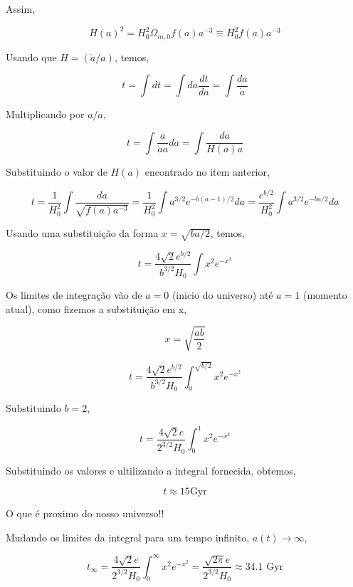 \documentclass[11pt]{article}
\begin{document}
\begin{pproblem}
\begin{pssolution*}{}{}
\begin{alternativas}
        Assim, 

        \[\boxed{H(a)^2 = H_0^2 \Omega_{m,0} f(a)a^{-3} \equiv H_0^2 f(a)a^{-3}}\]

        \item Usando que \(H = (\dot{a}/a)\), temos, 
        
        \[t = \int dt = \int da\frac{dt}{da} = \int \frac{da}{\dot{a}} \]

        Multiplicando por \(a/a\), 

        \[t = \int\frac{a}{\dot{a}a}da = \int \frac{da}{H(a)a}\]

        Substituindo o valor de \(H(a)\) encontrado no item anterior, 

        \[t = \frac{1}{H_0^2}\int\frac{da}{\sqrt{f(a)a^{-3}}} = \frac{1}{H_0^2}\int a^{3/2} e^{-b(a-1)/2}da = \frac{e^{b/2}}{H_0^2}\int a^{3/2}e^{-ba/2}da\]
        
        Usando uma substituição da forma \(x = \sqrt{ba/2}\), temos, 

        \[t = \frac{4\sqrt{2}e^{b/2}}{b^{3/2}H_0}\int x^2e^{-x^2}\]

        Os limites de integração vão de \(a=0\) (inicio do universo) até \(a=1\) (momento atual), como fizemos a substituição em x, 

        \[x = \sqrt{\frac{ab}{2}}\]

        \[t = \frac{4\sqrt{2}e^{b/2}}{b^{3/2}H_0}\int_0^{\sqrt{b/2}} x^2e^{-x^2}\]

        Substituindo \(b=2\), 

        \[t = \frac{4\sqrt{2}e}{2^{3/2}H_0}\int_0^{1} x^2e^{-x^2}\]

        Substituindo os valores e ultilizando a integral fornecida, obtemos, 

        \[\boxed{t \approx 15 \text{Gyr}}\]

        O que é proximo do nosso universo!!

        \item Mudando os limites da integral para um tempo infinito, \(a(t)\rightarrow \infty\), 
        
        \[\boxed{t_\infty = \frac{4\sqrt{2}e}{2^{3/2}H_0}\int_0^{\infty} x^2e^{-x^2} = \frac{\sqrt{2\pi}e}{2^{3/2}H_0} \approx 34.1\text{ Gyr}}\]

    \end{alternativas}
    
\end{pssolution*}
\end{pproblem}
\end{document}
